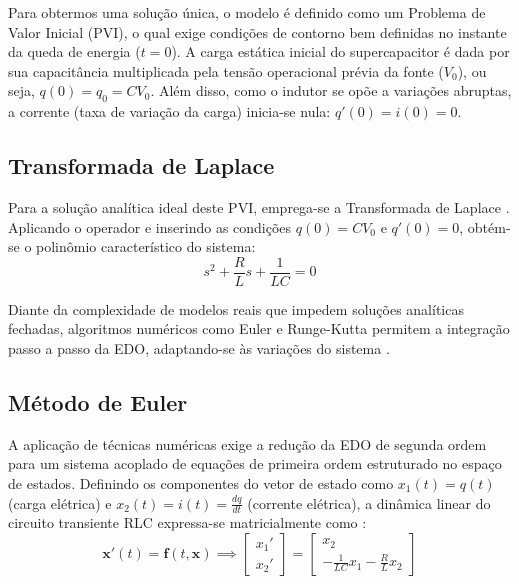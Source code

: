 \documentclass[11pt, a4paper]{article}
\begin{document}
Para obtermos uma solução única, o modelo é definido como um Problema de Valor Inicial (PVI), o qual exige condições de contorno bem definidas no instante da queda de energia ($t=0$). A carga estática inicial do supercapacitor é dada por sua capacitância multiplicada pela tensão operacional prévia da fonte ($V_0$), ou seja, $q(0) = q_0 = C V_0$. Além disso, como o indutor se opõe a variações abruptas, a corrente (taxa de variação da carga) inicia-se nula: $q'(0) = i(0) = 0$.

\subsection{Transformada de Laplace}

Para a solução analítica ideal deste PVI, emprega-se a Transformada de Laplace \cite{igwe2025}. Aplicando o operador e inserindo as condições $q(0) = C V_0$ e $q'(0) = 0$, obtém-se o polinômio característico do sistema:
\begin{equation}
    s^2 + \frac{R}{L} s + \frac{1}{LC} = 0
\end{equation}

Diante da complexidade de modelos reais que impedem soluções analíticas fechadas, algoritmos numéricos como Euler e Runge-Kutta permitem a integração passo a passo da EDO, adaptando-se às variações do sistema \cite{modelagem2026, igwe2025}.

\subsection{Método de Euler}
A aplicação de técnicas numéricas exige a redução da EDO de segunda ordem para um sistema acoplado de equações de primeira ordem estruturado no espaço de estados. Definindo os componentes do vetor de estado como $x_1(t) = q(t)$ (carga elétrica) e $x_2(t) = i(t) = \frac{dq}{dt}$ (corrente elétrica), a dinâmica linear do circuito transiente RLC expressa-se matricialmente como \cite{aselebe2026}:
\begin{equation}
    \mathbf{x}'(t) = \mathbf{f}(t, \mathbf{x}) \implies \begin{bmatrix} x_1' \\ x_2' \end{bmatrix} = \begin{bmatrix} x_2 \\ -\frac{1}{LC}x_1 - \frac{R}{L}x_2 \end{bmatrix}
\end{equation}
\end{document}
